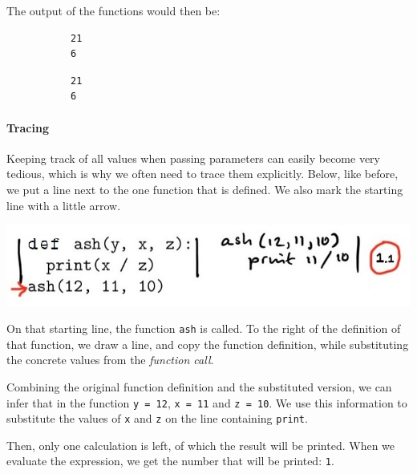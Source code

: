The output of the functions would then be:

\begin{figure}[h]
\begin{subfigure}[b]{.5\linewidth}
\begin{verbatim}
21
6
\end{verbatim}
\end{subfigure}
\begin{subfigure}[b]{.5\linewidth}
\begin{verbatim}
21
6
\end{verbatim}
\end{subfigure}
\end{figure}

\paragraph{Tracing}

Keeping track of all values when passing parameters can easily become very tedious, which is why we often need to trace them explicitly. Below, like before, we put a line next to the one function that is defined. We also mark the starting line with a little arrow.

\includegraphics[width=.8\textwidth]{2-trace-params.jpeg}

On that starting line, the function \texttt{ash} is called. To the right of the definition of that function, we draw a line, and copy the function definition, while substituting the concrete values from the \emph{function call}.

Combining the original function definition and the substituted version, we can infer that in the function \texttt{y = 12}, \texttt{x = 11} and \texttt{z = 10}. We use this information to substitute the values of \texttt{x} and \texttt{z} on the line containing \texttt{print}.

Then, only one calculation is left, of which the result will be printed. When we evaluate the expression, we get the number that will be printed: \texttt{1}.
